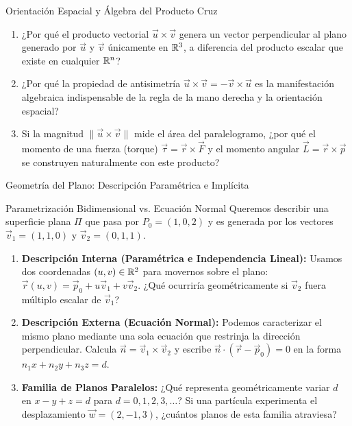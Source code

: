 \documentclass[10pt,aspectratio=169]{beamer}
\begin{document}
\begin{frame}{Orientación Espacial y Álgebra del Producto Cruz}
  \vspace{0.2cm}
  \small
  \begin{enumerate}\itemsep14pt
    \item ¿Por qué el producto vectorial $\vec{u}\times\vec{v}$ genera un vector perpendicular al plano generado por $\vec{u}$ y $\vec{v}$ únicamente en $\mathbb{R}^3$, a diferencia del producto escalar que existe en cualquier $\mathbb{R}^n$?
    \item ¿Por qué la propiedad de antisimetría $\vec{u}\times\vec{v} = -\vec{v}\times\vec{u}$ es la manifestación algebraica indispensable de la regla de la mano derecha y la orientación espacial?
    \item Si la magnitud $\|\vec{u}\times\vec{v}\|$ mide el área del paralelogramo, ¿por qué el momento de una fuerza (torque) $\vec{\tau} = \vec{r}\times\vec{F}$ y el momento angular $\vec{L} = \vec{r}\times\vec{p}$ se construyen naturalmente con este producto?
  \end{enumerate}
\end{frame}

\begin{frame}{Geometría del Plano: Descripción Paramétrica e Implícita}
  \begin{block}{Parametrización Bidimensional vs. Ecuación Normal}
    \footnotesize
    Queremos describir una superficie plana $\Pi$ que pasa por $P_0 = (1,0,2)$ y es generada por los vectores $\vec{v}_1 = (1, 1, 0)$ y $\vec{v}_2 = (0, 1, 1)$.
    \begin{enumerate}
      \itemsep2pt
      \item[(a)] \textbf{Descripción Interna (Paramétrica e Independencia Lineal):} Usamos dos coordenadas $(u,v) \in \mathbb{R}^2$ para movernos sobre el plano: $\vec{r}(u,v) = \vec{p}_0 + u\vec{v}_1 + v\vec{v}_2$. ¿Qué ocurriría geométricamente si $\vec{v}_2$ fuera múltiplo escalar de $\vec{v}_1$?
      \item[(b)] \textbf{Descripción Externa (Ecuación Normal):} Podemos caracterizar el mismo plano mediante una sola ecuación que restrinja la dirección perpendicular. Calcula $\vec{n} = \vec{v}_1 \times \vec{v}_2$ y escribe $\vec{n}\cdot(\vec{r} - \vec{p}_0) = 0$ en la forma $n_1 x + n_2 y + n_3 z = d$.
      \item[(c)] \textbf{Familia de Planos Paralelos:} ¿Qué representa geométricamente variar $d$ en $x - y + z = d$ para $d = 0, 1, 2, 3, \dots$? Si una partícula experimenta el desplazamiento $\vec{w} = (2, -1, 3)$, ¿cuántos planos de esta familia atraviesa?
    \end{enumerate}
  \end{block}
\end{frame}
\end{document}
